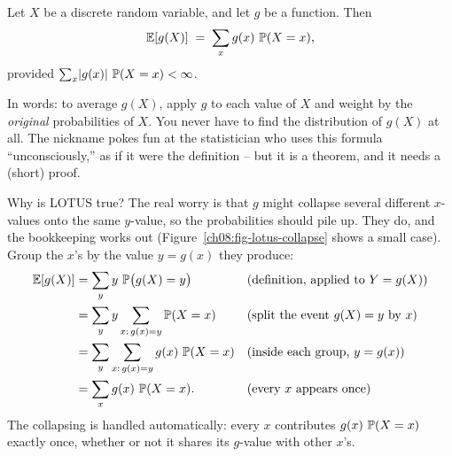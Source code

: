 \begin{theorem}
\label{ch08:thm-lotus}
Let $X$ be a discrete random variable, and let $g$ be a function.
Then
\[
  \E[g(X)] \;=\; \sum_{x} g(x)\,\P(X = x),
\]
provided $\sum_x \abs{g(x)}\,\P(X=x) < \infty$.
\end{theorem}

In words: to average $g(X)$, apply $g$ to each value of $X$ and weight by the
\emph{original} probabilities of $X$. You never have to find the distribution of
$g(X)$ at all. The nickname pokes fun at the statistician who uses this formula
``unconsciously,'' as if it were the definition -- but it is a theorem, and it
needs a (short) proof.

\begin{whybox}
Why is LOTUS true? The real worry is that $g$ might collapse several different
$x$-values onto the same $y$-value, so the probabilities should pile up. They do,
and the bookkeeping works out (Figure~\ref{ch08:fig-lotus-collapse} shows a
small case). Group the $x$'s by the value $y=g(x)$ they produce:
\begin{align*}
  \E[g(X)] &= \sum_y y\,\P\bigl(g(X)=y\bigr) && \text{(definition, applied to $Y=g(X)$)}\\
           &= \sum_y y \sum_{x:\,g(x)=y} \P(X=x) && \text{(split the event $g(X)=y$ by $x$)}\\
           &= \sum_y \sum_{x:\,g(x)=y} g(x)\,\P(X=x) && \text{(inside each group, $y=g(x)$)}\\
           &= \sum_x g(x)\,\P(X=x). && \text{(every $x$ appears once)}
\end{align*}
The collapsing is handled automatically: every $x$ contributes $g(x)\,\P(X=x)$
exactly once, whether or not it shares its $g$-value with other $x$'s.
\end{whybox}


